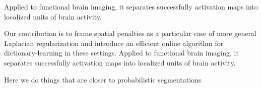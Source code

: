 Applied to
functional brain imaging, it separates successfully activation maps into
localized units of brain activity.

Our
contribution is to frame spatial penalties as a particular case of
more general Laplacian regularization and introduce an efficient online
algorithm for dictionary-learning in these settings. Applied to
functional brain imaging, it separates successfully activation maps into
localized units of brain activity.

Here we do things that are closer to probabilistic segmentations



